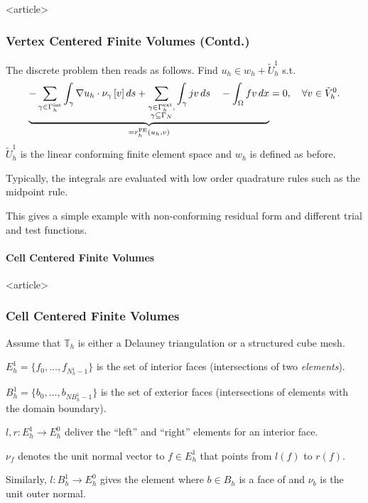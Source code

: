 \begin{frame}<article>
\frametitle<presentation>{Vertex Centered Finite Volumes (Contd.)}
The discrete problem then reads as follows. Find $u_h\in w_h+\tilde{U}_h^1$ s.t.
\begin{equation}
\underbrace{- \sum_{\gamma\in\Gamma_h^{\text{int}}} \int_\gamma
\nabla u_h \cdot \nu_\gamma \,[v]\,d s
+ \sum_{\substack{\gamma\in\Gamma_h^{\text{ext}},\\ \gamma\subseteq\Gamma_N}}
\int_\gamma j v \,d s\quad
- \int_\Omega fv \,d x}_{= r_h^\text{FE}(u_h,v)} = 0,
\quad \forall v\in \tilde{V}_h^0.
\end{equation}
$\tilde{U}_h^1$ is the linear conforming finite element space and $w_h$ is
defined as before.

Typically, the integrals are evaluated with low order quadrature rules
such as the midpoint rule.

This gives a simple example with non-conforming residual form and
different trial and test functions.
\end{frame}


\paragraph{Cell Centered Finite Volumes}

\begin{frame}<article>
\frametitle<presentation>{Cell Centered Finite Volumes}
Assume that $\mathbb{T}_h$ is either a Delauney
triangulation or a structured cube mesh.

$E^1_h = \{f_0,\ldots,f_{N^1_h-1}\}$ is the set of interior
faces (intersections of two \textit{elements}).

$B^1_h = \{b_0,\ldots,b_{NB^1_h-1}\}$ is the set of exterior faces
(intersections of elements with the domain boundary).

$l,r : E^1_h \to E^0_h$ deliver the ``left'' and ``right'' elements for an
interior face. 

$\nu_f$ denotes the unit normal vector to $f\in E^1_h$ that points from
$l(f)$ to $r(f)$.

Similarly, $l : B^1_h \to E^0_h$ gives the element where $b\in B_h$ is a
face of and $\nu_b$ is the unit outer normal.
\end{frame}



